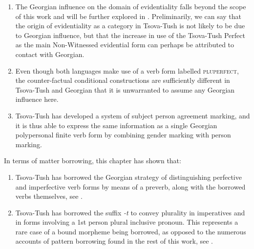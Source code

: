 \begin{enumerate}
	
	\item The Georgian influence on the domain of evidentiality falls beyond the scope of this work and will be further explored in \textcite{wsverhees2024nakhevid}. Preliminarily, we can say that the origin of evidentiality as a category in Tsova-Tush is not likely to be due to Georgian influence, but that the increase in use of the Tsova-Tush Perfect as the main Non-Witnessed evidential form can perhaps be attributed to contact with Georgian. 
	
	\item Even though both languages make use of a verb form labelled \textsc{pluperfect}, the counter-factual conditional constructions are sufficiently different in Tsova-Tush and Georgian that it is unwarranted to assume any Georgian influence here.
	
	\item Tsova-Tush has developed a system of subject person agreement marking, and it is thus able to express the same information as a single Georgian polypersonal finite verb form by combining gender marking with person marking.
\end{enumerate}

In terms of matter borrowing, this chapter has shown that: 

\begin{enumerate}
	
	\item Tsova-Tush has borrowed the Georgian strategy of distinguishing perfective and imperfective verb forms by means of a preverb, along with the borrowed verbs themselves, see .
	
	\item Tsova-Tush has borrowed the suffix \textit{-t} to convey plurality in imperatives and in forms involving a 1st person plural inclusive pronoun. This represents a rare case of a bound morpheme being borrowed, as opposed to the numerous accounts of pattern borrowing found in the rest of this work, see .
\end{enumerate}
